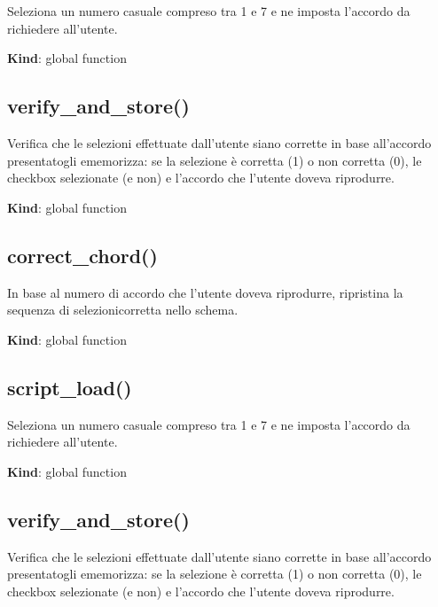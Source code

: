 Seleziona un numero casuale compreso tra 1 e 7 e ne imposta l'accordo da
richiedere all'utente.

\textbf{Kind}: global function\\
\protect\hypertarget{verify_and_store}{}{}

\hypertarget{verify_and_store}{%
\subsection{verify\_and\_store()}\label{verify_and_store}}

Verifica che le selezioni effettuate dall'utente siano corrette in base
all'accordo presentatogli ememorizza: se la selezione è corretta (1) o
non corretta (0), le checkbox selezionate (e non) e l'accordo che
l'utente doveva riprodurre.

\textbf{Kind}: global function\\
\protect\hypertarget{correct_chord}{}{}

\hypertarget{correct_chord}{%
\subsection{correct\_chord()}\label{correct_chord}}

In base al numero di accordo che l'utente doveva riprodurre, ripristina
la sequenza di selezionicorretta nello schema.

\textbf{Kind}: global function\\
\protect\hypertarget{script_load}{}{}

\hypertarget{script_load-1}{%
\subsection{script\_load()}\label{script_load-1}}

Seleziona un numero casuale compreso tra 1 e 7 e ne imposta l'accordo da
richiedere all'utente.

\textbf{Kind}: global function\\
\protect\hypertarget{verify_and_store}{}{}

\hypertarget{verify_and_store-1}{%
\subsection{verify\_and\_store()}\label{verify_and_store-1}}

Verifica che le selezioni effettuate dall'utente siano corrette in base
all'accordo presentatogli ememorizza: se la selezione è corretta (1) o
non corretta (0), le checkbox selezionate (e non) e l'accordo che
l'utente doveva riprodurre.

